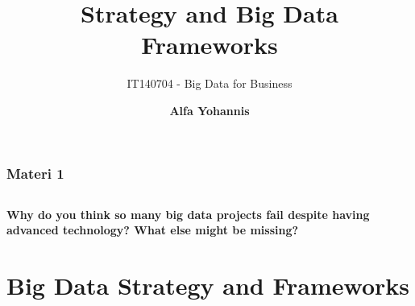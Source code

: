 \documentclass[aspectratio=169, table]{beamer}
\title{\Huge Strategy and Big Data\\
	\vspace{10pt}
	Frameworks}
\subtitle{IT140704 - Big Data for Business}
\author{\textbf{Alfa Yohannis}}
\begin{document}
	
	\frame{\titlepage}
	
	
	\begin{frame}[fragile]
		\frametitle{Materi 1}
		\vspace{20pt}
		\begin{columns}[t]
			\tableofcontents[sections={1-3}]
			
			\tableofcontents[sections={4-6}]
		\end{columns}
	\end{frame}

	\begin{frame}{\hfill}
		\centering
		\Huge{\textbf{Why do you think so many big data projects fail despite having advanced technology? What else might be missing?}}
	\end{frame}
	
	\section{Big Data Strategy and Frameworks}
	
\end{document}
